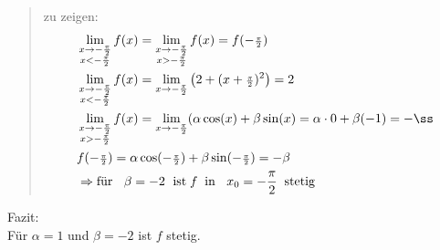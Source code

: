 \begin{quote}
	zu zeigen:
	\begin{align*}
	&\lim\limits_ {\substack{x \to -\frac{\pi}{2}  \\ x<-\frac{\pi}{2}}}f(x)=\lim\limits_ {\substack{x \to -\frac{\pi}{2} \\ x>-\frac{\pi}{2}}}f(x)=f(-\genfrac{}{}{}{2}{\pi}{2 })\\
	&\lim\limits_ {\substack{x \to -\frac{\pi}{2}  \\ x<-\frac{\pi}{2}}}f(x)=\lim\limits_ {x\to -\frac{\pi}{2}}\big(2+(x+\genfrac{}{}{}{2}{\pi}{2})^2\big)=2\\
	&\lim\limits_ {\substack{x \to -\frac{\pi}{2}  \\ x>-\frac{\pi}{2}}}f(x)=\lim\limits_ {x\to -\frac{\pi}{2}}(\alpha \cos(x)+\beta \sin(x)=\alpha\cdot 0+\beta(-1)=-ß\\
	&f(-\genfrac{}{}{}{2}{\pi }{2})=\alpha \cos(-\genfrac{}{}{}{2}{\pi}{2})+\beta \sin(-\genfrac{}{}{}{2}{\pi}{2})=-\beta\\
	&\Rightarrow \text{für }\;\;\beta=-2\;\text{ ist}\;f \;\;\text{in }\;\;x_0=-\frac{\pi}{2}\;\;\text{stetig }
	\end{align*}
\end{quote}
Fazit:\\
Für $ \alpha=1 $ und $ \beta=-2 $ ist $ f $ stetig.\\
